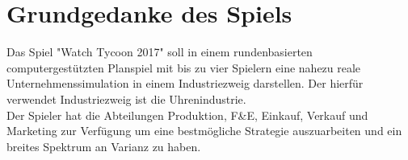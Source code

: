 \clearpage
\chapter{Grundgedanke des Spiels}
Das Spiel "Watch Tycoon 2017" soll in einem rundenbasierten computergestützten Planspiel mit bis zu vier Spielern eine nahezu reale Unternehmenssimulation in einem Industriezweig darstellen. Der hierfür verwendet Industriezweig ist die Uhrenindustrie.\\
Der Spieler hat die Abteilungen Produktion, F\&E, Einkauf, Verkauf und Marketing zur Verfügung um eine bestmögliche Strategie auszuarbeiten und ein breites Spektrum an Varianz zu haben.\\

